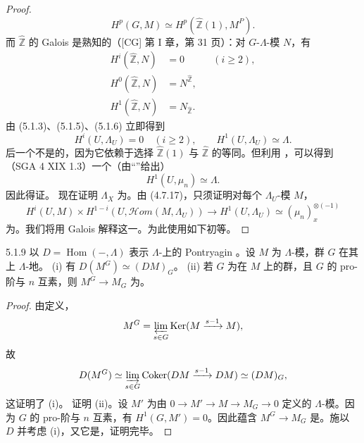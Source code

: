 \begin{proof}
\[
H^p(G,M)\simeq H^p(\widehat{\mathbb Z}(1),M^P).\tag{5.1.5}
\]
而 $\widehat{\mathbb Z}$ 的 Galois 是熟知的（[CG] 第 I 章，第 31 页）：对 $G$-$\Lambda$-模 $N$，有
\[
\begin{aligned}
H^i(\widehat{\mathbb Z},N)&=0&& (i\geq2),\\
H^0(\widehat{\mathbb Z},N)&=N^{\widehat{\mathbb Z}},\\
H^1(\widehat{\mathbb Z},N)&=N_{\widehat{\mathbb Z}}.
\end{aligned}\tag{5.1.6}
\]
由 (5.1.3)、(5.1.5)、(5.1.6) 立即得到
\[
H^i(U,\Lambda_U)=0\quad(i\geq2),\qquad H^1(U,\Lambda_U)\simeq\Lambda.
\]
后一个不是的，因为它依赖于选择 $\widehat{\mathbb Z}(1)$ 与 $\widehat{\mathbb Z}$ 的等同。但利用 ，可以得到（SGA 4 XIX 1.3）一个（由“”给出）
\[
H^1(U,\mu_n)\simeq\Lambda.\tag{5.1.7}
\]
因此得证。
现在证明 $\Lambda_X$ 为。由 (4.7.17)，只须证明对每个 $\Lambda_U$-模 $M$，
\[
H^i(U,M)\times H^{1-i}(U,\mathscr Hom(M,\Lambda_U))\longrightarrow H^1(U,\Lambda_U)\simeq(\mu_n)_x^{\otimes(-1)}\tag{5.1.8}
\]
为。我们将用 Galois 解释这一。为此使用如下初等。
\end{proof}
\begin{SGAresult}{}{5.1.9}
以 $D=\operatorname{Hom}(-,\Lambda)$ 表示 $\Lambda$-上的 Pontryagin 。设 $M$ 为 $\Lambda$-模，群 $G$ 在其上 $\Lambda$-地。
(i) 有 $D(M^G)\simeq(DM)_G$。
(ii) 若 $G$ 为在 $M$ 上的群，且 $G$ 的 pro-阶与 $n$ 互素，则 $M^G\to M_G$ 为。
\end{SGAresult}
\begin{proof}
由定义，
\[M^G=\varprojlim_{s\in G}\operatorname{Ker}(M\xrightarrow{s-1}M),\]
故
\[
D(M^G)\simeq\varinjlim_{s\in G}\operatorname{Coker}(DM\xrightarrow{s-1}DM)\simeq(DM)_G,
\]
这证明了 (i)。
证明 (ii)。设 $M'$ 为由 $0\to M'\to M\to M_G\to0$ 定义的 $\Lambda$-模。因为 $G$ 的 pro-阶与 $n$ 互素，有 $H^1(G,M')=0$。因此蕴含 $M^G\to M_G$ 是。施以 $D$ 并考虑 (i)，又它是，证明完毕。
\end{proof}
